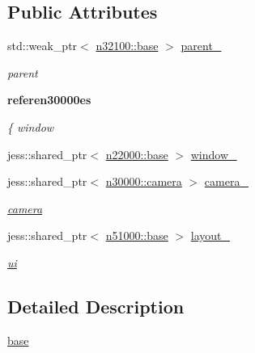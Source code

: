 \subsection*{Public Attributes}
\begin{DoxyCompactItemize}
\item 
std::weak\_\-ptr$<$ \hyperlink{classnebula_1_1content_1_1scene_1_1admin_1_1base}{n32100::base} $>$ \hyperlink{classnebula_1_1content_1_1view_1_1admin_1_1base_a138792f8feeb7b9a84b83ccf2a7c5948}{parent\_\-}
\begin{DoxyCompactList}\small\item\em parent \item\end{DoxyCompactList}\end{DoxyCompactItemize}
\begin{Indent}{\bf referen30000es}\par
{\em \label{_amgrp16178abad80368084b8136c19c0f3c43}
 \{ window }\begin{DoxyCompactItemize}
\item 
jess::shared\_\-ptr$<$ \hyperlink{classnebula_1_1platform_1_1window_1_1base}{n22000::base} $>$ \hyperlink{classnebula_1_1content_1_1view_1_1admin_1_1base_a4e7dd25a9c5f6868f98598668cb0d330}{window\_\-}
\item 
jess::shared\_\-ptr$<$ \hyperlink{classnebula_1_1content_1_1camera}{n30000::camera} $>$ \hyperlink{classnebula_1_1content_1_1view_1_1admin_1_1base_ac106d137754b09ea326f6f839d1271a0}{camera\_\-}
\begin{DoxyCompactList}\small\item\em \hyperlink{classnebula_1_1content_1_1camera}{camera} \item\end{DoxyCompactList}\item 
jess::shared\_\-ptr$<$ \hyperlink{classnebula_1_1ui_1_1layout_1_1base}{n51000::base} $>$ \hyperlink{classnebula_1_1content_1_1view_1_1admin_1_1base_a4b4b7828544d4b7bdf60ff77e4f19d40}{layout\_\-}
\begin{DoxyCompactList}\small\item\em \hyperlink{namespacenebula_1_1ui}{ui} \item\end{DoxyCompactList}\end{DoxyCompactItemize}
\end{Indent}


\subsection{Detailed Description}
\hyperlink{classnebula_1_1content_1_1view_1_1admin_1_1base}{base} 

